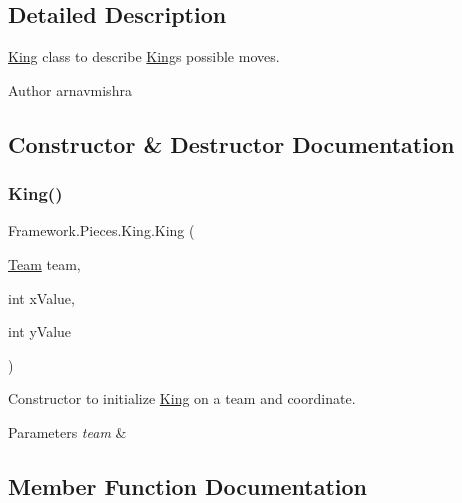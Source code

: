 \subsection{Detailed Description}
\hyperlink{class_framework_1_1_pieces_1_1_king}{King} class to describe \hyperlink{class_framework_1_1_pieces_1_1_king}{King}\textquotesingle{}s possible moves. \begin{DoxyAuthor}{Author}
arnavmishra 
\end{DoxyAuthor}


\subsection{Constructor \& Destructor Documentation}
\hypertarget{class_framework_1_1_pieces_1_1_king_a575f966ed4a301227581a844b85437a4}{}\label{class_framework_1_1_pieces_1_1_king_a575f966ed4a301227581a844b85437a4} 
\subsubsection{\texorpdfstring{King()}{King()}}
{\footnotesize\ttfamily Framework.\+Pieces.\+King.\+King (\begin{DoxyParamCaption}\item[{\hyperlink{class_framework_1_1_team}{Team}}]{team,  }\item[{int}]{x\+Value,  }\item[{int}]{y\+Value }\end{DoxyParamCaption})}

Constructor to initialize \hyperlink{class_framework_1_1_pieces_1_1_king}{King} on a team and coordinate. 
\begin{DoxyParams}{Parameters}
{\em team} & \\
\hline
\end{DoxyParams}


\subsection{Member Function Documentation}
\hypertarget{class_framework_1_1_pieces_1_1_king_a4d92e625681cb6e64b68803fa41fedc1}{}\label{class_framework_1_1_pieces_1_1_king_a4d92e625681cb6e64b68803fa41fedc1} 
